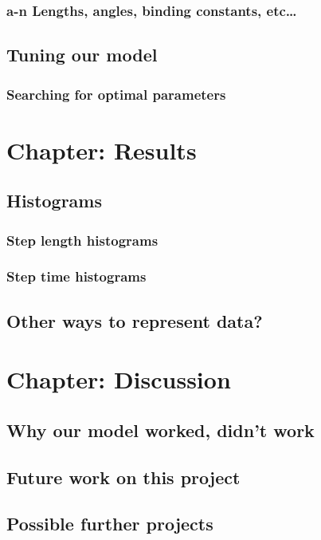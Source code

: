 \documentclass[10pt]{article} %
\begin{document}
			\subsubsection{a-n Lengths, angles, binding constants, etc…}
	\subsection{Tuning our model}
		\subsubsection{Searching for optimal parameters}
\section{Chapter: Results}
	\subsection{Histograms}
		\subsubsection{Step length histograms}
		\subsubsection{Step time histograms}
	\subsection{Other ways to represent data?}


\section{Chapter: Discussion}
	\subsection{Why our model worked, didn’t work}
	\subsection{Future work on this project}
	\subsection{Possible further projects}
\end{document}
